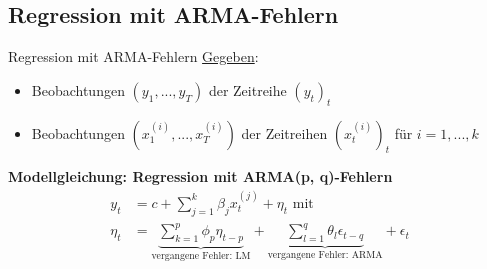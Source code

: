 \subsection{Regression mit ARMA-Fehlern}
\begin{frame}{Regression mit ARMA-Fehlern}
	\underline{Gegeben}: 
	\begin{itemize}
		\item Beobachtungen $(y_1,...,y_T)$ der Zeitreihe $(y_t)_t$
		\item Beobachtungen $(x_1^{(i)},...,x_T^{(i)})$ der Zeitreihen $(x_t^{(i)})_t$ für $i=1,...,k$
	\end{itemize}
	\textbf{Modellgleichung: Regression mit ARMA(p, q)-Fehlern}\\
	\begin{align*}
		y_t &= c + \sum_{j=1}^{k}\beta_j x_t^{(j)} + \eta_t \text{ mit} \\
		\eta_t &= \underbrace{\sum_{k=1}^{p}\phi_p\eta_{t-p}}_{\text{vergangene Fehler: LM}} + \underbrace{\sum_{l=1}^{q}\theta_l\epsilon_{t-q}}_{\text{vergangene Fehler: ARMA}} + \epsilon_{t}
	\end{align*}

\end{frame}


	


